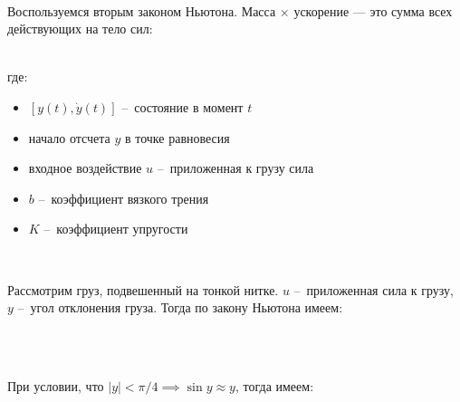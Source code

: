 \

Воспользуемся вторым законом Ньютона. Масса $\times$ ускорение — это сумма всех действующих на тело сил: \\

\

где:
\begin{itemize}
  \item $[y(t), \dot{y}(t)]$ – состояние в момент $t$
  \item начало отсчета $y$ в точке равновесия
  \item входное воздействие $u$ – приложенная к грузу сила
  \item $b$ – коэффициент вязкого трения
  \item $K$ – коэффициент упругости
\end{itemize}
\


Рассмотрим груз, подвешенный на тонкой нитке. $u$ – приложенная сила к грузу, $y$ – угол отклонения груза. Тогда по закону Ньютона имеем: \\

\

\

При условии, что $|y| < \pi / 4 \implies \sin{y} \approx y$, тогда имеем: \\

\



%

%
